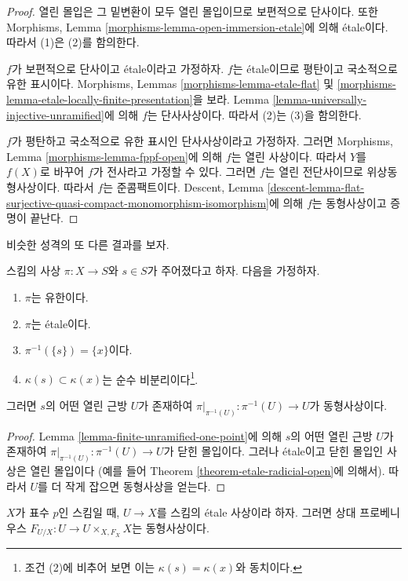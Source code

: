 \begin{proof}
열린 몰입은 그 밑변환이 모두 열린 몰입이므로 보편적으로 단사이다.
또한 Morphisms, Lemma
\ref{morphisms-lemma-open-immersion-etale}에 의해 \'etale이다.
따라서 (1)은 (2)를 함의한다.

\medskip\noindent
$f$가 보편적으로 단사이고 \'etale이라고 가정하자.
$f$는 \'etale이므로 평탄이고 국소적으로 유한 표시이다.
Morphisms, Lemmas \ref{morphisms-lemma-etale-flat} 및
\ref{morphisms-lemma-etale-locally-finite-presentation}을 보라.
Lemma \ref{lemma-universally-injective-unramified}에 의해
$f$는 단사사상이다. 따라서 (2)는 (3)을 함의한다.

\medskip\noindent
$f$가 평탄하고 국소적으로 유한 표시인 단사사상이라고 가정하자.
그러면 Morphisms, Lemma
\ref{morphisms-lemma-fppf-open}에 의해 $f$는 열린 사상이다.
따라서 $Y$를 $f(X)$로 바꾸어 $f$가 전사라고 가정할 수 있다.
그러면 $f$는 열린 전단사이므로 위상동형사상이다.
따라서 $f$는 준콤팩트이다. Descent, Lemma
\ref{descent-lemma-flat-surjective-quasi-compact-monomorphism-isomorphism}에
의해 $f$는 동형사상이고 증명이 끝난다.
\end{proof}

\noindent
비슷한 성격의 또 다른 결과를 보자.

\begin{lemma}
\label{lemma-finite-etale-one-point}
스킴의 사상 $\pi : X \to S$와 $s \in S$가 주어졌다고 하자.
다음을 가정하자.
\begin{enumerate}
\item $\pi$는 유한이다.
\item $\pi$는 \'etale이다.
\item $\pi^{-1}(\{s\}) = \{x\}$이다.
\item $\kappa(s) \subset \kappa(x)$는 순수
비분리이다\footnote{조건 (2)에 비추어 보면 이는
$\kappa(s) = \kappa(x)$와 동치이다.}.
\end{enumerate}
그러면 $s$의 어떤 열린 근방 $U$가 존재하여
$\pi|_{\pi^{-1}(U)} : \pi^{-1}(U) \to U$가 동형사상이다.
\end{lemma}

\begin{proof}
Lemma \ref{lemma-finite-unramified-one-point}에 의해
$s$의 어떤 열린 근방 $U$가 존재하여
$\pi|_{\pi^{-1}(U)} : \pi^{-1}(U) \to U$가 닫힌 몰입이다.
그러나 \'etale이고 닫힌 몰입인 사상은 열린 몰입이다
(예를 들어 Theorem \ref{theorem-etale-radicial-open}에 의해서).
따라서 $U$를 더 작게 잡으면 동형사상을 얻는다.
\end{proof}

\begin{lemma}
\label{lemma-relative-frobenius-etale}
$X$가 표수 $p$인 스킴일 때, $U \to X$를 스킴의
\'etale 사상이라 하자.
그러면 상대 프로베니우스
$F_{U/X} : U \to U \times_{X, F_X} X$는 동형사상이다.
\end{lemma}

